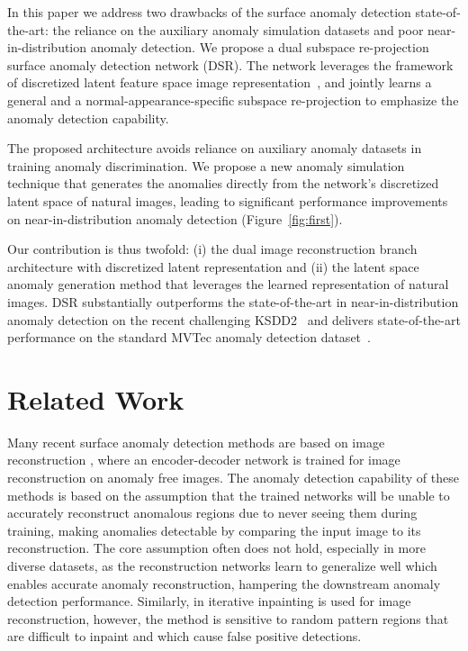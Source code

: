 \documentclass[runningheads]{llncs}
\begin{document}
In this paper we address two drawbacks of the surface anomaly detection state-of-the-art: the reliance on the auxiliary anomaly simulation datasets and poor near-in-distribution anomaly detection.
We propose a dual subspace re-projection surface anomaly detection network (DSR). The network leverages the 
framework of discretized latent feature space image representation~\cite{vqvae2}, and jointly learns a general and a normal-appearance-specific subspace re-projection to emphasize the anomaly detection capability. 

The proposed architecture avoids reliance on auxiliary anomaly datasets in training anomaly discrimination. 
We propose a new anomaly simulation technique that generates the anomalies directly from the network's discretized latent space of natural images, leading to significant performance improvements on near-in-distribution anomaly detection (Figure~\ref{fig:first}). 

Our contribution is thus twofold: (i) the dual image reconstruction branch architecture with discretized latent representation and (ii) the latent space anomaly generation method that leverages the learned representation of natural images. DSR substantially outperforms the state-of-the-art in near-in-distribution anomaly detection on the recent challenging KSDD2~\cite{bovzivc2021mixed} and delivers state-of-the-art performance on the standard MVTec anomaly detection dataset~\cite{bergmann2019mvtec}.


\section{Related Work}
Many recent surface anomaly detection methods are based on image reconstruction \cite{akcay2018ganomaly,akccay2019skip,bergmann2018improving}, where an encoder-decoder network is trained for image reconstruction on anomaly free images. The anomaly detection capability of these methods is based on the assumption that the trained networks will be unable to accurately reconstruct anomalous regions due to never seeing them during training, making anomalies detectable by comparing the input image to its reconstruction. The core assumption often does not hold, especially in more diverse datasets, as the reconstruction networks learn to generalize well which enables accurate anomaly reconstruction, hampering the downstream anomaly detection performance. Similarly, in \cite{zavrtanik2020riad} iterative inpainting is used for image reconstruction, however, the method is sensitive to random pattern regions that are difficult to inpaint and which cause false positive detections.
\end{document}
